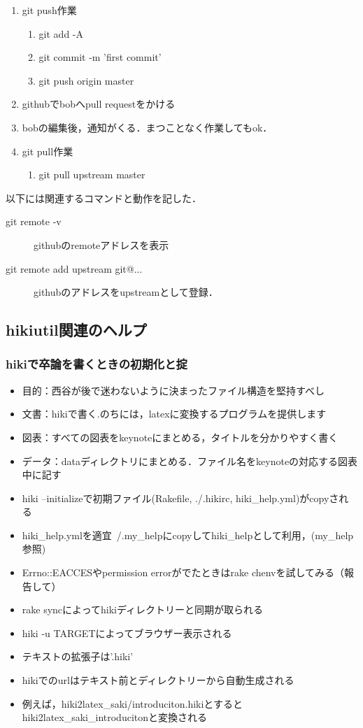 \begin{enumerate}
\item git push作業
\begin{enumerate}
\item git add -A
\item git commit -m 'first commit'
\item git push origin master
\end{enumerate}
\item githubでbobへpull requestをかける
\item bobの編集後，通知がくる．まつことなく作業してもok．
\item git pull作業
\begin{enumerate}
\item git pull upstream master
\end{enumerate}
\end{enumerate}
以下には関連するコマンドと動作を記した．
\begin{description}
\item[git remote -v]  githubのremoteアドレスを表示

\item[git remote add upstream git@...] githubのアドレスをupstreamとして登録．

\end{description}
\subsection{hikiutil関連のヘルプ}
\subsubsection{hikiで卒論を書くときの初期化と掟}
\begin{itemize}
\item 目的：西谷が後で迷わないように決まったファイル構造を堅持すべし
\item 文書：hikiで書く.のちには，latexに変換するプログラムを提供します
\item 図表：すべての図表をkeynoteにまとめる，タイトルを分かりやすく書く
\item データ：dataディレクトリにまとめる．ファイル名をkeynoteの対応する図表中に記す
\item hiki --initializeで初期ファイル(Rakefile, ./.hikirc, hiki\_help.yml)がcopyされる
\item hiki\_help.ymlを適宜~/.my\_helpにcopyしてhiki\_helpとして利用，(my\_help参照)
\item Errno::EACCESやpermission errorがでたときはrake chenvを試してみる（報告して）
\item rake syncによってhikiディレクトリーと同期が取られる
\item hiki -u TARGETによってブラウザー表示される
\item テキストの拡張子は'.hiki'
\item hikiでのurlはテキスト前とディレクトリーから自動生成される
\item 例えば，hiki2latex\_saki/introduciton.hikiとするとhiki2latex\_saki\_introducitonと変換される
\end{itemize}
